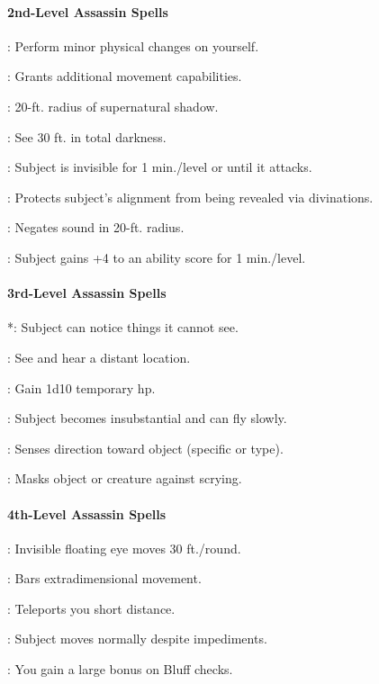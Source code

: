 \paragraph{2nd-Level Assassin Spells}
\begin{list}{}{\leftmargin=1em}
\item {}: Perform minor physical changes on yourself.
\item {}: Grants additional movement capabilities.
\item {}: 20-ft. radius of supernatural shadow.
\item {}: See 30 ft. in total darkness.
\item {}: Subject is invisible for 1 min./level or until it attacks.
\item {}: Protects subject's alignment from being revealed via divinations.
\item {}: Negates sound in 20-ft. radius.
\item {}: Subject gains +4 to an ability score for 1 min./level.
\end{list}
\paragraph{3rd-Level Assassin Spells}
\begin{list}{}{\leftmargin=1em}
\item {}*: Subject can notice things it cannot see.
\item {}: See and hear a distant location.
\item {}: Gain 1d10 temporary hp.
\item {}: Subject becomes insubstantial and can fly slowly.
\item {}: Senses direction toward object (specific or type).
\item {}: Masks object or creature against scrying.
\end{list}
\paragraph{4th-Level Assassin Spells}
\begin{list}{}{\leftmargin=1em}
\item {}: Invisible floating eye moves 30 ft./round.
\item {}: Bars extradimensional movement.
\item {}: Teleports you short distance.
\item {}: Subject moves normally despite impediments.
\item {}: You gain a large bonus on Bluff checks.
\end{list}
